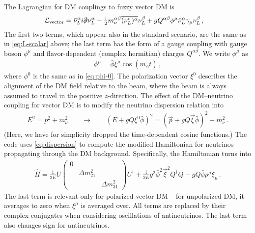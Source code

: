 \documentclass{scrartcl}
\begin{document}
The Lagrangian for DM couplings to fuzzy vector DM is \cite{Brdar:2017kbt}
\begin{align}
  \mathcal{L}_\text{vector}
    &= \bar\nu_L^\alpha i \slashed\partial \nu_L^\alpha
     - \tfrac{1}{2} m_\nu^{\alpha\beta} \overline{(\nu_L^c)^\alpha} \nu_L^\beta
     + g Q^{\alpha\beta} \phi^\mu \bar{\nu}_L^\alpha \gamma_\mu \nu_L^\beta \,,
  \label{eq:L-vector}
\end{align}
The first two terms, which appear also in the standard scenario,  are the
same as in \cref{eq:L-scalar} above; the last term has the form of a gauge
coupling with gauge boson $\phi^\mu$ and flavor-dependent (complex hermitian)
charges $Q^{\alpha\beta}$.  We write $\phi^\mu$ as
\begin{align}
  \phi^\mu = \bar\phi \xi^\mu \cos(m_\phi t) \,,
  \label{eq:phi-osc-vector}
\end{align}
where $\phi^0$ is the same as in \cref{eq:phi-0}.  The polarization vector $\xi^0$
describes the alignment of the DM field relative to the beam, where the
beam is always assumed to travel in the positive $z$-direction.
The effect of the DM--neutrino coupling for vector DM is to modify the neutrino
dispersion relation into
\begin{align}
  E^2 = p^2 + m_\nu^2  \qquad\to\qquad
  (E + g Q \xi^0 \bar\phi)^2 = (\vec{p} + g Q \vec\xi \bar\phi)^2 + m_\nu^2 \,.
  \label{eq:dispersion}
\end{align}
(Here, we have for simplicity dropped the time-dependent cosine functions.)
The code uses \cref{eq:dispersion} to compute the modified Hamiltonian for
neutrinos propagating through the DM background.  Specifically, the Hamiltonian
turns into
\begin{align}
  \hat{H} = \frac{1}{2E} U \begin{pmatrix}
                             0 &                 &                  \\
                               & \Delta m_{21}^2 &                  \\
                               &                 & \Delta m_{31}^2
                           \end{pmatrix}  U^\dag
          + \frac{1}{2 E} g^2 \bar\phi^2 \vec\xi^2 Q^\dag Q
          - g Q \bar\phi p^\mu \xi_\mu \,.
\end{align}
The last term is relevant only for polarized vector DM -- for unpolarized DM,
it averages to zero when $\xi^\mu$ is averaged over.  All terms are replaced
by their complex conjugates when considering oscillations of antineutrinos.
The last term also changes sign for antineutrinos.
\end{document}
